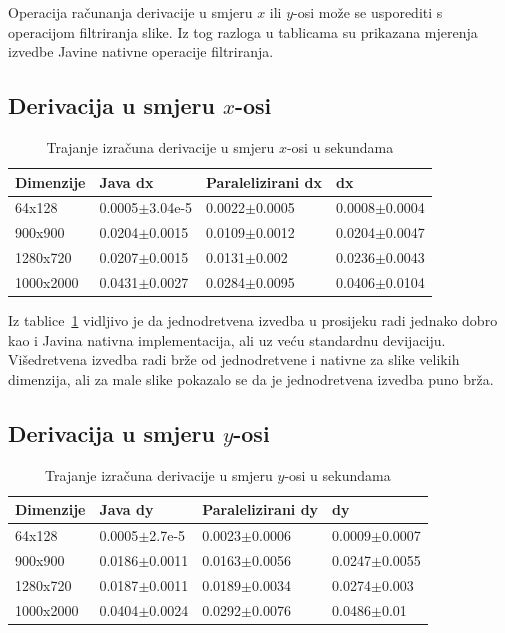 \documentclass[times, utf8, zavrsni]{fer}
\begin{document}
Operacija računanja derivacije u smjeru \(x\) ili \(y\)-osi može se usporediti s operacijom filtriranja slike. Iz tog razloga u tablicama su prikazana mjerenja izvedbe Javine nativne operacije filtriranja.

\subsection{Derivacija u smjeru \(x\)-osi}

\begin{table}[htb]
	\centering
	\caption{Trajanje izračuna derivacije u smjeru \(x\)-osi u sekundama}
	\label{tbl:dx}
	\begin{tabular}{llll} \hline
		Dimenzije & Java dx & Paralelizirani dx & dx\\ \hline
		64x128 & 0.0005$\pm$3.04e-5 & 0.0022$\pm$0.0005 & 0.0008$\pm$0.0004\\
		900x900 & 0.0204$\pm$0.0015 & 0.0109$\pm$0.0012 & 0.0204$\pm$0.0047\\
		1280x720 & 0.0207$\pm$0.0015 & 0.0131$\pm$0.002 & 0.0236$\pm$0.0043\\
		1000x2000 & 0.0431$\pm$0.0027 & 0.0284$\pm$0.0095 & 0.0406$\pm$0.0104\\ \hline
	\end{tabular}
\end{table}

Iz tablice~\ref{tbl:dx} vidljivo je da jednodretvena izvedba u prosijeku radi jednako dobro kao i Javina nativna implementacija, ali uz veću standardnu devijaciju. Višedretvena izvedba radi brže od jednodretvene i nativne za slike velikih dimenzija, ali za male slike pokazalo se da je jednodretvena izvedba puno brža.

\subsection{Derivacija u smjeru \(y\)-osi}

\begin{table}[htb]
	\centering
	\caption{Trajanje izračuna derivacije u smjeru \(y\)-osi u sekundama}
	\label{tbl:dy}
	\begin{tabular}{llll} \hline
		Dimenzije & Java dy & Paralelizirani dy & dy\\ \hline
		64x128 & 0.0005$\pm$2.7e-5 & 0.0023$\pm$0.0006 & 0.0009$\pm$0.0007\\
		900x900 & 0.0186$\pm$0.0011 & 0.0163$\pm$0.0056 & 0.0247$\pm$0.0055\\
		1280x720 & 0.0187$\pm$0.0011 & 0.0189$\pm$0.0034 & 0.0274$\pm$0.003\\
		1000x2000 & 0.0404$\pm$0.0024 & 0.0292$\pm$0.0076 & 0.0486$\pm$0.01\\ \hline
	\end{tabular}
\end{table}
\end{document}
